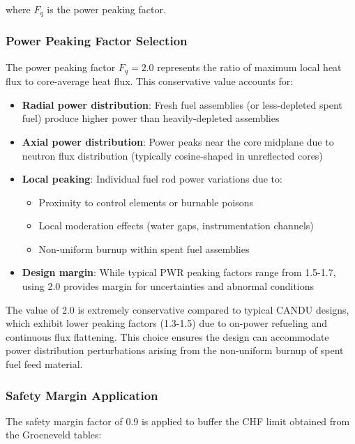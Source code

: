 where $F_q$ is the power peaking factor.

\subsubsection{Power Peaking Factor Selection}

The power peaking factor $F_q = 2.0$ represents the ratio of maximum local heat flux to core-average heat flux. This conservative value accounts for:

\begin{itemize}
    \item \textbf{Radial power distribution}: Fresh fuel assemblies (or less-depleted spent fuel) produce higher power than heavily-depleted assemblies
    
    \item \textbf{Axial power distribution}: Power peaks near the core midplane due to neutron flux distribution (typically cosine-shaped in unreflected cores)
    
    \item \textbf{Local peaking}: Individual fuel rod power variations due to:
    \begin{itemize}
        \item Proximity to control elements or burnable poisons
        \item Local moderation effects (water gaps, instrumentation channels)
        \item Non-uniform burnup within spent fuel assemblies
    \end{itemize}
    
    \item \textbf{Design margin}: While typical PWR peaking factors range from 1.5-1.7, using 2.0 provides margin for uncertainties and abnormal conditions
\end{itemize}

The value of 2.0 is extremely conservative compared to typical CANDU designs, which exhibit lower peaking factors (1.3-1.5) due to on-power refueling and continuous flux flattening. This choice ensures the design can accommodate power distribution perturbations arising from the non-uniform burnup of spent fuel feed material.

\subsubsection{Safety Margin Application}

The safety margin factor of 0.9 is applied to buffer the CHF limit obtained from the Groeneveld tables:

